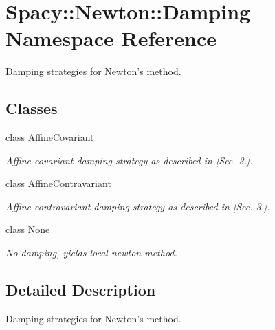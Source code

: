 \hypertarget{namespaceSpacy_1_1Newton_1_1Damping}{\section{Spacy\-:\-:Newton\-:\-:Damping Namespace Reference}
\label{namespaceSpacy_1_1Newton_1_1Damping}
}


Damping strategies for Newton's method.  


\subsection*{Classes}
\begin{DoxyCompactItemize}
\item 
class \hyperlink{classSpacy_1_1Newton_1_1Damping_1_1AffineCovariant}{Affine\-Covariant}
\begin{DoxyCompactList}\small\item\em Affine covariant damping strategy as described in \cite{Deuflhard2004} \mbox{[}Sec. 3.\mbox{]}. \end{DoxyCompactList}\item 
class \hyperlink{classSpacy_1_1Newton_1_1Damping_1_1AffineContravariant}{Affine\-Contravariant}
\begin{DoxyCompactList}\small\item\em Affine contravariant damping strategy as described in \cite{Deuflhard2004} \mbox{[}Sec. 3.\mbox{]}. \end{DoxyCompactList}\item 
class \hyperlink{classSpacy_1_1Newton_1_1Damping_1_1None}{None}
\begin{DoxyCompactList}\small\item\em No damping, yields local newton method. \end{DoxyCompactList}\end{DoxyCompactItemize}


\subsection{Detailed Description}
Damping strategies for Newton's method. 